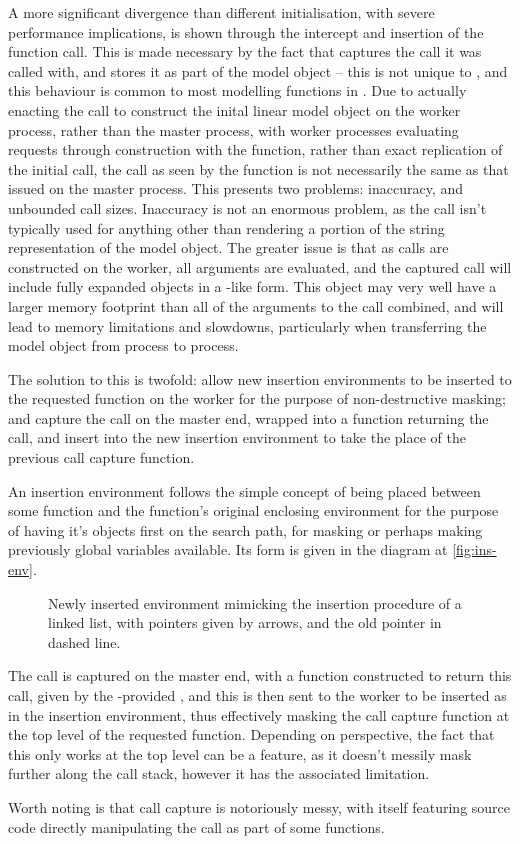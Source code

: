 A more significant divergence than different initialisation, with severe performance implications, is shown through the intercept and insertion of the function call.
This is made necessary by the fact that  captures the call it was called with, and stores it as part of the model object -- this is not unique to , and this behaviour is common to most modelling functions in \R{}.
Due to actually enacting the call to construct the inital  linear model object on the worker process, rather than the master process, with worker processes evaluating requests through construction with the  function, rather than exact replication of the initial call, the call as seen by the function is not necessarily the same as that issued on the master process.
This presents two problems: inaccuracy, and unbounded call sizes.
Inaccuracy is not an enormous problem, as the call isn't typically used for anything other than rendering a portion of the string representation of the model object.
The greater issue is that as calls are constructed on the worker, all arguments are evaluated, and the captured call will include fully expanded objects in a -like form.
This object may very well have a larger memory footprint than all of the arguments to the call combined, and will lead to memory limitations and slowdowns, particularly when transferring the model object from process to process.

The solution to this is twofold: allow new insertion environments to be inserted to the requested function on the worker for the purpose of non-destructive masking; and capture the call on the master end, wrapped into a function returning the call, and insert into the new insertion environment to take the place of the previous call capture function.

An insertion environment follows the simple concept of being placed between some function and the function's original enclosing environment for the purpose of having it's objects first on the search path, for masking or perhaps making previously global variables available.
Its form is given in the diagram at \cref{fig:ins-env}.

\begin{figure}

\caption{Newly inserted environment mimicking the insertion procedure of a linked list, with pointers given by arrows, and the old pointer in dashed line.}
\end{figure}


The call is captured on the master end, with a function constructed to return this call, given by the \lsr{}-provided , and this is then sent to the worker to be inserted as  in the insertion environment, thus effectively masking the call capture function at the top level of the requested  function.
Depending on perspective, the fact that this only works at the top level can be a feature, as it doesn't messily mask further along the call stack, however it has the associated limitation.

Worth noting is that call capture is notoriously messy, with  itself featuring source code directly manipulating the call as part of some functions.

